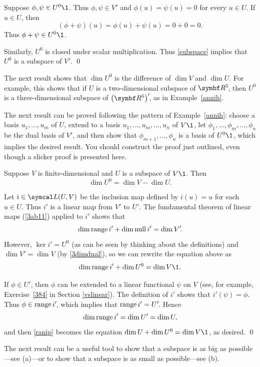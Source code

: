 Suppose $\phi, \psi \in U^0\1$. Thus $\phi, \psi \in V'$ and $\phi(u) = \psi(u) = 0$ for every $u \in U$. If $u \in U$, then
\[
(\phi + \psi)(u) = \phi(u) + \psi(u) = 0 + 0 = 0.
\]
Thus $\phi + \psi \in U^0\1$.

Similarly, $U^0$ is closed under scalar multiplication. Thus \ref{subspace} implies that $U^0$ is a subspace of $V'\!$.
\qed

The next result shows that $\dim U^0$ is the difference of $\dim V$ and $\dim U$.
For example, this shows that if $U$ is a two-dimensional subspace of $\RR5$, then $U^0$ is a three-dimensional subspace of ${\paren[\big]{\R{5}}}'\!$, as in Example~\ref{annih}.

The next result can be proved following the pattern of Example~\ref{annih}: choose a basis $u_1, \dots, u_m$ of $U$, extend to a basis $u_1, \dots, u_m, \dots, u_n$ of $V\1$, let $\phi_1, \dots, \phi_m, \dots, \phi_n$ be the dual basis of $V'\!$, and then show that $\phi_{m+1}, \dots, \phi_n$ is a basis of $U^0\1$, which implies the desired result. You should construct the proof just outlined, even though a slicker proof is presented here.

{Suppose $V$ is finite-dimensional and $U$ is a subspace of $V\1$. Then
\[
\dim U^0 = \dim V - \dim U.
\]}

\proof
Let $i \in \L(U, V)$ be the inclusion map defined by $i(u) = u$ for each $u \in U$. Thus $i'$ is a linear map from $V'$ to $U'\!$. The fundamental theorem of linear maps (\ref{3ab11}) applied to $i'$ shows that
\[
\dim \operatorname{range} i' + \dim \operatorname{null} i' = \dim V'\!.
\]
However, $\ker i' = U^0$ (as can be seen by thinking about the definitions) and $\dim V' = \dim V$ (by \ref{3dimdual}), so we can rewrite the equation above as
\begin{equation} \label{ranip}
\dim \ran i' + \dim U^0 = \dim V\1.
\end{equation}%

If $\phi \in U'\!$, then $\phi$ can be extended to a linear functional $\psi$ on $V$ (see, for example, Exercise~\ref{384} in Section \ref{vslinear}). The definition of $i'$ shows that \mbox{$i' \! (\psi) = \phi$}. Thus $\phi \in \operatorname{range} i'\!$, which implies that $\operatorname{range} i' = U'\!$. Hence
\[
\dim \operatorname{range} i' = \dim U' = \dim U,
\]
and then \ref{ranip} becomes the equation $\dim U + \dim U^0 = \dim V\1$, as desired.
\qed

\pagebreak[3]

The next result can be a useful tool to show that a subspace is as big as possible---see (a)---or to show that a subspace is as small as possible---see (b).

